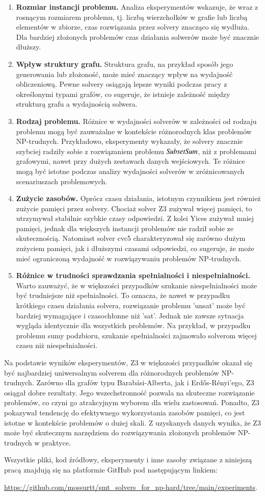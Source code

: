 \begin{enumerate}
	\item \textbf{Rozmiar instancji problemu.} 
	Analiza eksperymentów wskazuje, że wraz z rosnącym rozmiarem problemu, tj. liczbą wierzchołków w grafie lub liczbą elementów w zbiorze, czas rozwiązania przez solvery znacząco się wydłuża. Dla bardziej złożonych problemów czas działania solwerów może być znacznie dłuższy.
	\item \textbf{Wpływ struktury grafu.}
	Struktura grafu, na przykład sposób jego generowania lub złożoność, może mieć znaczący wpływ na wydajność obliczeniową. Pewne solvery osiągają lepsze wyniki podczas pracy z określonymi typami grafów, co sugeruje, że istnieje zależność między strukturą grafu a wydajnością solwera.
	\item \textbf{Rodzaj problemu.} 
	Różnice w wydajności solverów w zależności od rodzaju problemu mogą być zauważalne w kontekście różnorodnych klas problemów NP-trudnych. Przykładowo, eksperymenty wykazały, że solvery znacznie szybciej radziły sobie z rozwiązaniem problemu ${\mathit{SubsetSum}}$, niż z problemami grafowymi, nawet przy dużych zestawach danych wejściowych. Te różnice mogą być istotne podczas analizy wydajności solverów w zróżnicowanych scenariuszach problemowych.
	\item \textbf{Zużycie zasobów.} 
	Oprócz czasu działania, istotnym czynnikiem jest również zużycie pamięci przez solvery. Chociaż solver Z3 zużywał więcej pamięci, to utrzymywał stabilnie szybkie czasy odpowiedzi. Z kolei Yices zużywał mniej pamięci, jednak dla większych instancji problemów nie radził sobie ze skutecznością. Natomiast solver cvc5 charakteryzował się zarówno dużym zużyciem pamięci, jak i dłuższymi czasami odpowiedzi, co sugeruje, że może mieć ograniczoną wydajność w rozwiązywaniu problemów NP-trudnych.
	\item \textbf{Różnice w trudności sprawdzania spełnialności i niespełnialności.} 
	Warto zauważyć, że w większości przypadków szukanie niespełnialności może być trudniejsze niż spełnialności. To oznacza, że nawet w przypadku krótkiego czasu działania solvera, rozwiązanie problemu 'unsat' może być bardziej wymagające i czasochłonne niż 'sat'. Jednak nie zawsze sytuacja wygląda identycznie dla wszystkich problemów. Na przykład, w przypadku problemu sumy podzbioru, szukanie spełnialności zajmowało solverom więcej czasu niż niespełnialności. 
\end{enumerate}	

Na podstawie wyników eksperymentów, Z3 w większości przypadków okazał się być najbardziej uniwersalnym solverem dla różnorodnych problemów NP-trudnych. Zarówno dla grafów typu Barabási-Alberta, jak i Erdős-Rényi'ego, Z3 osiągał dobre rezultaty. Jego wszechstronność pozwala na skuteczne rozwiązanie problemów, co czyni go atrakcyjnym wyborem dla wielu zastosowań. Ponadto, Z3 pokazywał tendencję do efektywnego wykorzystania zasobów pamięci, co jest istotne w kontekście problemów o dużej skali. Z uzyskanych danych wynika, że Z3 może być skutecznym narzędziem do rozwiązywania złożonych problemów NP-trudnych w praktyce.

Wszystkie pliki, kod źródłowy, eksperymenty i inne zasoby związane z niniejszą pracą znajdują się na platformie GitHub pod następującym linkiem:

\url{https://github.com/mossurtt/smt_solvers_for_np-hard/tree/main/experiments}.